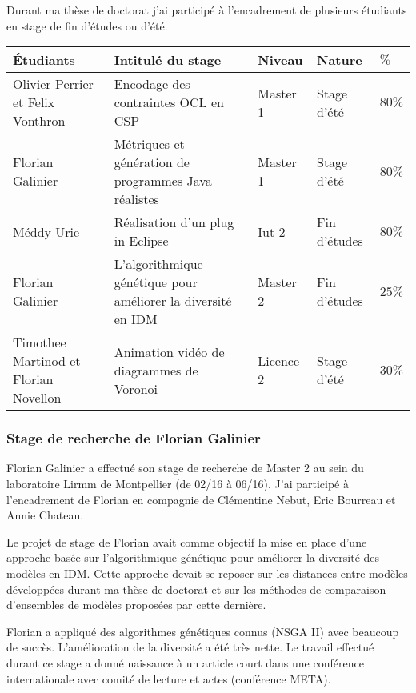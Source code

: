 Durant ma thèse de doctorat j'ai participé à l'encadrement de plusieurs étudiants en stage de fin d'études ou d'été.

\begin{tabular}{m{3cm}|m{6.2cm}m{1.6cm}m{2cm}m{0.5cm}} 
    \hline
    {\bf Étudiants} & {\bf Intitulé du stage} &{\bf Niveau} & {\bf Nature} & {\bf $\%$} \\
    \hline
    Olivier Perrier et Felix Vonthron & Encodage des contraintes OCL en CSP & Master 1 & Stage d'été & $80\%$ \\
    Florian Galinier & Métriques et génération de programmes Java réalistes & Master 1 & Stage d'été & $80\%$ \\ 
    Méddy Urie      & Réalisation d'un plug in Eclipse & Iut 2 & Fin d'études & $80\%$ \\
    Florian Galinier & L'algorithmique génétique pour améliorer la diversité en IDM & Master 2 & Fin d'études & $25\%$ \\ 
    Timothee Martinod et Florian Novellon & Animation vidéo de diagrammes de Voronoi & Licence 2 & Stage d'été & $30\%$ \\
    \hline
\end{tabular}

\subsubsection*{Stage de recherche de Florian Galinier}

Florian Galinier a effectué son stage de recherche de Master 2 au sein du laboratoire Lirmm de Montpellier (de 02/16 à 06/16). J'ai participé à l'encadrement de Florian en compagnie de Clémentine Nebut, Eric Bourreau et Annie Chateau. 

Le projet de stage de Florian avait comme objectif la mise en place d'une approche basée sur l'algorithmique génétique pour améliorer la diversité des modèles en IDM. Cette approche devait se reposer sur les distances entre modèles développées durant ma thèse de doctorat et sur les méthodes de comparaison d'ensembles de modèles proposées par cette dernière.

Florian a appliqué des algorithmes génétiques connus (NSGA II) avec beaucoup de succès. L'amélioration de la diversité a été très nette. Le travail effectué durant ce stage a donné naissance à un article court dans une conférence internationale avec comité de lecture et actes (conférence META).     

